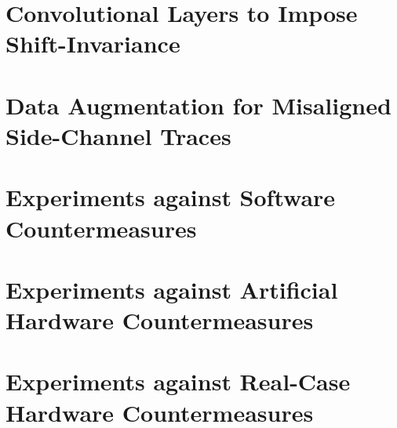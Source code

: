 
\section{Convolutional Layers to Impose Shift-Invariance}


\section{Data Augmentation for Misaligned Side-Channel Traces}

\section{Experiments against Software Countermeasures}



\section{Experiments against Artificial Hardware Countermeasures}\label{sec:hardware}%


\section{Experiments against Real-Case Hardware Countermeasures}